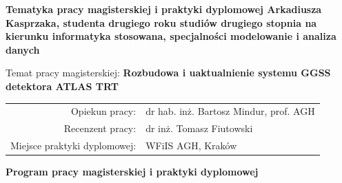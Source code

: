 \documentclass[11pt]{aghdpl}
\begin{document}

\newpage
\mbox{} 


\newpage
{}
\begin{center}
{\bf Tematyka pracy magisterskiej i praktyki dyplomowej Arkadiusza Kasprzaka,
studenta drugiego roku studiów drugiego stopnia na kierunku informatyka stosowana, specjalności modelowanie i analiza danych}\\
\end{center}

Temat pracy magisterskiej:
{\bf Rozbudowa i uaktualnienie systemu GGSS detektora ATLAS TRT}\\

\begin{tabular}{rl}

Opiekun pracy:                  & dr hab. inż. Bartosz Mindur, prof. AGH \\
Recenzent pracy:                & dr inż. Tomasz Fiutowski \\
Miejsce praktyki dyplomowej:    & WFiIS AGH, Kraków\\
\end{tabular}

\begin{center}
{\bf Program pracy magisterskiej i praktyki dyplomowej}
\end{center}
\end{document}
